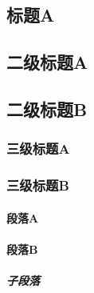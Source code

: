    \begin{texsepcode}
        \begin{texcodenoshad}
            \section{标题A}
            \subsection{二级标题A}
            \subsection{二级标题B}
            \subsubsection{三级标题A}
            \subsubsection{三级标题B}
            \paragraph{段落A}
            \paragraph{段落B}
            \subparagraph{子段落}

\end{texcodenoshad}
\end{texsepcode}
